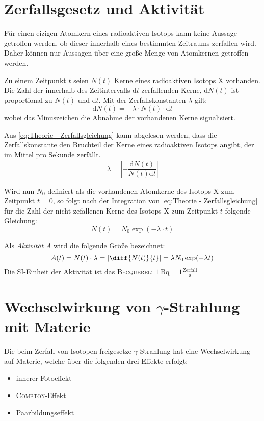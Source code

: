 \documentclass[../protokoll.tex]{subfiles}
\begin{document}
\section{Zerfallsgesetz und Aktivität}
Für einen eizigen Atomkern eines radioaktiven Isotops kann keine Aussage
getroffen werden, ob dieser innerhalb eines bestimmten Zeitraums zerfallen wird.
Daher können nur Aussagen über eine große Menge von Atomkernen getroffen werden.

Zu einem Zeitpunkt $t$ seien $N(t)$ Kerne eines radioaktiven Isotops X 
vorhanden. Die Zahl der innerhalb des Zeitintervalls $\mathrm{d}t$ zerfallenden
Kerne, $\mathrm{d}N(t)$ ist proportional zu $N(t)$ und $\mathrm{d}t$. Mit der
Zerfallskonstanten $\lambda$ gilt:
\begin{equation}\label{eq:Theorie - Zerfallsgleichung}
    \mathrm{d}N(t) = - \lambda \cdot N(t) \cdot \mathrm{d}t
\end{equation}
wobei das Minuszeichen die Abnahme der vorhandenen Kerne signalisiert.

Aus \cref{eq:Theorie - Zerfallsgleichung} kann abgelesen werden, dass die
Zerfallskonstante den Bruchteil der Kerne eines radioaktiven Isotops angibt, der
im Mittel pro Sekunde zerfällt.
\begin{equation}\label{eq:Zerfallskonstante}
    \lambda = \left| - \dfrac{\mathrm{d}N(t)}{N(t) \mathrm{d}t} \right|
\end{equation}

Wird nun $N_0$ definiert als die vorhandenen Atomkerne des Isotops X zum 
Zeitpunkt $t=0$, so folgt nach der Integration von 
\cref{eq:Theorie - Zerfallsgleichung} für die Zahl der nicht zefallenen Kerne
des Isotops X zum Zeitpunkt $t$ folgende Gleichung:
\begin{equation}\label{eq:Vorhandene Kerne}
    N(t) = N_0 \exp(-\lambda \cdot t)
\end{equation}

Als \textsl{Aktivität} $A$ wird die folgende Größe bezeichnet:
\begin{equation}\label{eq:Aktivität}
    A(t) = N(t) \cdot \lambda = \left| \diff{N(t)}{t} \right| = \lambda N_0 \exp(- \lambda t)
\end{equation}
Die SI-Einheit der Aktivität ist das \textsc{Becquerel}: $\qty{1}{\becquerel} = 1 \frac{\text{Zerfall}}{\unit{\second}}$
\newpage


\section{Wechselwirkung von \texorpdfstring{$\gamma$}{Gamma}-Strahlung mit Materie}
Die beim Zerfall von Isotopen freigesetze $\gamma$-Strahlung hat eine
Wechselwirkung auf Materie, welche über die folgenden drei Effekte erfolgt:
\begin{itemize}[noitemsep,nosep]
    \item innerer Fotoeffekt
    \item \textsc{Compton}-Effekt
    \item Paarbildungseffekt
\end{itemize}
\end{document}
